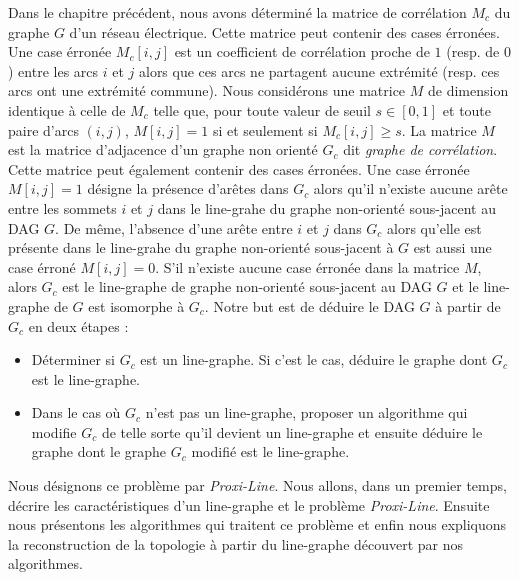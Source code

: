 Dans le chapitre pr\'ec\'edent, nous avons d\'etermin\'e la matrice de corr\'elation $M_c$ du graphe $G$ d'un r\'eseau \'electrique. Cette matrice peut contenir des cases \'erron\'ees. Une case \'erron\'ee  $M_c[i,j]$ est un coefficient de corr\'elation proche de $1$ (resp. de $0$) entre les arcs $i$ et $j$ alors que ces arcs ne partagent aucune extr\'emit\'e (resp. ces arcs ont une extr\'emit\'e commune).
\newline
Nous consid\'erons une matrice $M$ de dimension identique \`a celle de $M_c$ telle que, pour toute valeur de seuil $s \in [0,1]$ et toute paire d'arcs $(i,j)$, $M[i,j] = 1$ si et seulement si $M_c[i,j] \ge s$. La matrice $M$ est la matrice d'adjacence d'un graphe non orient\'e $G_c$ dit {\em graphe de corr\'elation}. Cette matrice peut \'egalement contenir des cases \'erron\'ees.  
Une case \'erron\'ee $M[i,j] = 1$ d\'esigne la pr\'esence d'ar\^etes dans $G_c$ alors qu'il n'existe aucune ar\^ete entre les sommets $i$ et $j$ dans le line-grahe du graphe non-orient\'e sous-jacent au DAG $G$. 
De m\^eme, l'absence d'une ar\^ete entre $i$ et $j$ dans $G_c$ alors qu'elle est pr\'esente dans le line-grahe du graphe non-orient\'e sous-jacent \`a $G$ est aussi une case \'erron\'e  $M[i,j] = 0$.
\newline 
S'il n'existe aucune case \'erron\'ee dans la matrice $M$, alors $G_c$ est le line-graphe de graphe non-orient\'e sous-jacent au DAG $G$ et le line-graphe de $G$ est isomorphe \`a $G_c$.
Notre but est de d\'eduire le DAG $G$ \`a partir de $G_c$ en deux \'etapes :
\begin{itemize}
	\item D\'eterminer si $G_c$ est un line-graphe. Si c'est  le cas, d\'eduire le graphe dont $G_c$ est le line-graphe.
	\item Dans le cas o\`u $G_c$ n'est pas un line-graphe, proposer un algorithme qui modifie $G_c$ de telle sorte qu'il devient un line-graphe et ensuite d\'eduire le graphe dont le graphe $G_c$ modifi\'e est le line-graphe.
\end{itemize}
 Nous d\'esignons ce probl\`eme par {\em Proxi-Line}.
\newline
Nous allons, dans un premier temps, d\'ecrire les caract\'eristiques d'un line-graphe et le probl\`eme {\em Proxi-Line}. Ensuite nous pr\'esentons les algorithmes qui traitent ce probl\`eme et enfin nous expliquons la reconstruction de la topologie \`a partir du line-graphe d\'ecouvert par nos algorithmes. 



